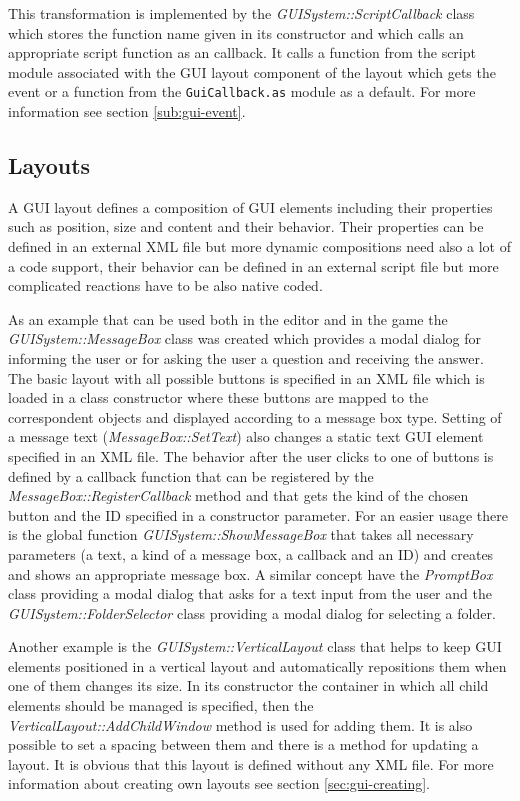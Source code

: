 This transformation is implemented by the \emph{GUISystem::ScriptCallback} class which stores the function name given in its constructor and which calls an appropriate script function as an callback. It calls a function from the script module associated with the GUI layout component of the layout which gets the event or a function from the \verb/GuiCallback.as/ module as a default. For more information see section \ref{sub:gui-event}.

\subsection{Layouts}
\label{sub:gui-layouts}

A GUI layout defines a composition of GUI elements including their properties such as position, size and content and their behavior. Their properties can be defined in an external XML file but more dynamic compositions need also a lot of a code support, their behavior can be defined in an external script file but more complicated reactions have to be also native coded.

As an example that can be used both in the editor and in the game the \emph{GUISystem::MessageBox} class was created which provides a modal dialog for informing the user or for asking the user a question and receiving the answer. The basic layout with all possible buttons is specified in an XML file which is loaded in a class constructor where these buttons are mapped to the correspondent objects and displayed according to a message box type. Setting of a message text (\emph{MessageBox::SetText}) also changes a static text GUI element specified in an XML file. The behavior after the user clicks to one of buttons is defined by a callback function that can be registered by the \emph{MessageBox::RegisterCallback} method and that gets the kind of the chosen button and the ID specified in a constructor parameter. For an easier usage there is the global function \emph{GUISystem::ShowMessageBox} that takes all necessary parameters (a text, a kind of a message box, a callback and an ID) and creates and shows an appropriate message box. A similar concept have the \emph{PromptBox} class providing a modal dialog that asks for a text input from the user and the \emph{GUISystem::FolderSelector} class providing a modal dialog for selecting a folder.

Another example is the \emph{GUISystem::VerticalLayout} class that helps to keep GUI elements positioned in a vertical layout and automatically repositions them when one of them changes its size. In its constructor the container in which all child elements should be managed is specified, then the \emph{VerticalLayout::AddChildWindow} method is used for adding them. It is also possible to set a spacing between them and there is a method for updating a layout. It is obvious that this layout is defined without any XML file. For more information about creating own layouts see section \ref{sec:gui-creating}.

